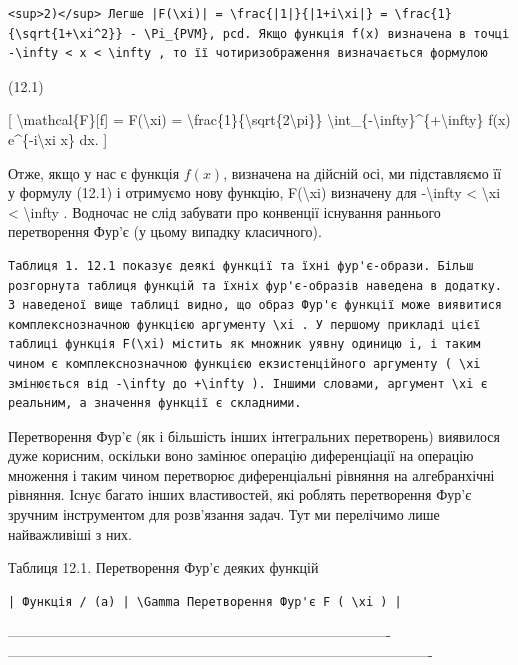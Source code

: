 \documentclass[
]{article}
\begin{document}
\begin{verbatim}
<sup>2)</sup> Легше |F(\xi)| = \frac{|1|}{|1+i\xi|} = \frac{1}{\sqrt{1+\xi^2}} - \Pi_{PVM}, pcd. Якщо функція f(x) визначена в точці -\infty < x < \infty , то її чотиризображення визначається формулою
\end{verbatim}

(12.1)

{[} \textbackslash mathcal\{F\}{[}f{]} = F(\textbackslash xi) =
\textbackslash frac\{1\}\{\textbackslash sqrt\{2\textbackslash pi\}\}
\textbackslash int\_\{-\textbackslash infty\}\^{}\{+\textbackslash infty\}
f(x) e\^{}\{-i\textbackslash xi x\} dx. {]}

Отже, якщо у нас є функція \(f(x)\), визначена на дійсній осі, ми
підставляємо її у формулу (12.1) і отримуємо нову функцію,
F(\textbackslash xi) визначену для -\textbackslash infty \textless{}
\textbackslash xi \textless{} \textbackslash infty . Водночас не слід
забувати про конвенції існування раннього перетворення Фур'є (у цьому
випадку класичного).

\begin{verbatim}
Таблиця 1. 12.1 показує деякі функції та їхні фур'є-образи. Більш розгорнута таблиця функцій та їхніх фур'є-образів наведена в додатку. З наведеної вище таблиці видно, що образ Фур'є функції може виявитися комплекснозначною функцією аргументу \xi . У першому прикладі цієї таблиці функція F(\xi) містить як множник уявну одиницю i, і таким чином є комплекснозначною функцією екзистенційного аргументу ( \xi змінюється від -\infty до +\infty ). Іншими словами, аргумент \xi є реальним, а значення функції є складними.
\end{verbatim}

Перетворення Фур'є (як і більшість інших інтегральних перетворень)
виявилося дуже корисним, оскільки воно замінює операцію диференціації на
операцію множення і таким чином перетворює диференціальні рівняння на
алгебранхічні рівняння. Існує багато інших властивостей, які роблять
перетворення Фур'є зручним інструментом для розв'язання задач. Тут ми
перелічимо лише найважливіші з них.

Таблиця 12.1. Перетворення Фур'є деяких функцій

\begin{verbatim}
| Функція / (a) | \Gamma Перетворення Фур'є F ( \xi ) |
\end{verbatim}

\textbar----------------------------------------------------------------------------------\textbar-------------------------------------------------------------------------------------------\textbar{}
\end{document}
